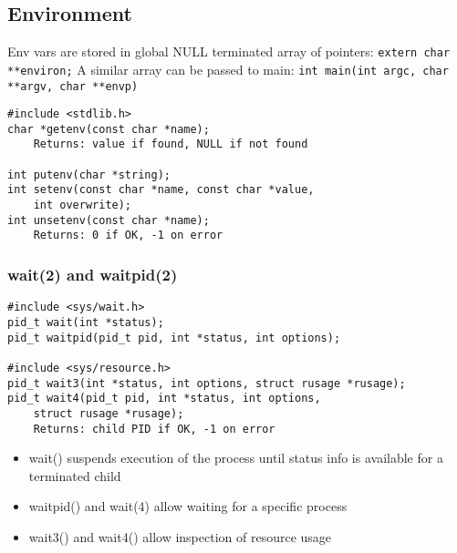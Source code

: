 \documentclass[10pt]{article}
\begin{document}
\begin{multicols}{2}
\begin{minipage}{\columnwidth}
        \subsection*{Environment}
        Env vars are stored in global NULL terminated array of pointers:
        \lstinline|extern char **environ;| A similar array can be passed
        to main: \lstinline|int main(int argc, char **argv, char **envp)|
        \begin{lstlisting}
#include <stdlib.h>
char *getenv(const char *name);
    Returns: value if found, NULL if not found

int putenv(char *string);
int setenv(const char *name, const char *value,
    int overwrite);
int unsetenv(const char *name);
    Returns: 0 if OK, -1 on error
        \end{lstlisting}
        \subsubsection*{wait(2) and waitpid(2)}
        \begin{lstlisting}
#include <sys/wait.h>
pid_t wait(int *status);
pid_t waitpid(pid_t pid, int *status, int options);

#include <sys/resource.h>
pid_t wait3(int *status, int options, struct rusage *rusage);
pid_t wait4(pid_t pid, int *status, int options,
    struct rusage *rusage);
    Returns: child PID if OK, -1 on error
        \end{lstlisting}
        \begin{itemize}
            \setlength{\itemsep}{0em}
            \item wait() suspends execution of the process until status info is available for a terminated child
            \item waitpid() and wait(4) allow waiting for a specific process
            \item wait3() and wait4() allow inspection of resource usage
        \end{itemize}

\end{minipage}
\end{multicols}
\end{document}
